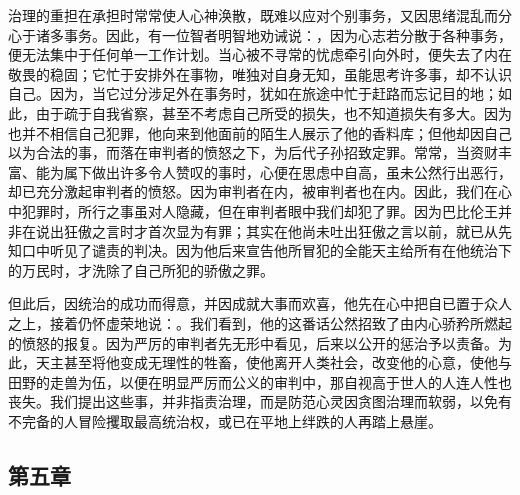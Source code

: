 治理的重担在承担时常常使人心神涣散，既难以应对个别事务，又因思绪混乱而分心于诸多事务。因此，有一位智者明智地劝诫说：，因为心志若分散于各种事务，便无法集中于任何单一工作计划。当心被不寻常的忧虑牵引向外时，便失去了内在敬畏的稳固；它忙于安排外在事物，唯独对自身无知，虽能思考许多事，却不认识自己。因为，当它过分涉足外在事务时，犹如在旅途中忙于赶路而忘记目的地；如此，由于疏于自我省察，甚至不考虑自己所受的损失，也不知道损失有多大。因为也并不相信自己犯罪，他向来到他面前的陌生人展示了他的香料库；但他却因自己以为合法的事，而落在审判者的愤怒之下，为后代子孙招致定罪。常常，当资财丰富、能为属下做出许多令人赞叹的事时，心便在思虑中自高，虽未公然行出恶行，却已充分激起审判者的愤怒。因为审判者在内，被审判者也在内。因此，我们在心中犯罪时，所行之事虽对人隐藏，但在审判者眼中我们却犯了罪。因为巴比伦王并非在说出狂傲之言时才首次显为有罪；其实在他尚未吐出狂傲之言以前，就已从先知口中听见了谴责的判决。因为他后来宣告他所冒犯的全能天主给所有在他统治下的万民时，才洗除了自己所犯的骄傲之罪。\par

但此后，因统治的成功而得意，并因成就大事而欢喜，他先在心中把自已置于众人之上，接着仍怀虚荣地说：。我们看到，他的这番话公然招致了由内心骄矜所燃起的愤怒的报复。因为严厉的审判者先无形中看见，后来以公开的惩治予以责备。为此，天主甚至将他变成无理性的牲畜，使他离开人类社会，改变他的心意，使他与田野的走兽为伍，以便在明显严厉而公义的审判中，那自视高于世人的人连人性也丧失。我们提出这些事，并非指责治理，而是防范心灵因贪图治理而软弱，以免有不完备的人冒险攫取最高统治权，或已在平地上绊跌的人再踏上悬崖。\par


\subsection{第五章}

\par

